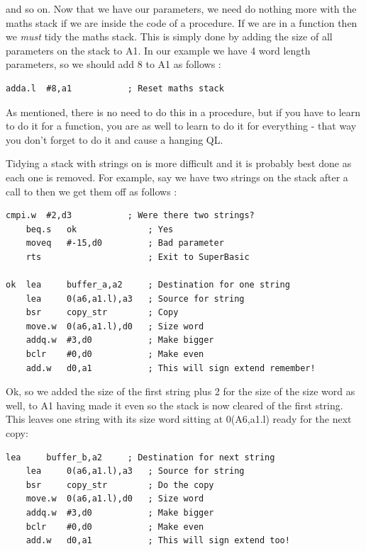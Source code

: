and so on. Now that we have our parameters, we need do nothing more
    with the maths stack if we are inside the code of a procedure. If we are
    in a function then we \emph{must} tidy the maths stack. This is simply done by
    adding the size of all parameters on the stack to A1. In our example we
    have 4 word length parameters, so we should add 8 to A1 as follows
   :

\begin{lstlisting}[firstnumber=1,]
        adda.l  #8,a1           ; Reset maths stack
\end{lstlisting}

As mentioned, there is no need to do this in a procedure, but if you
    have to learn to do it for a function, you are as well to learn to do it
    for everything -{} that way you don't forget to do it and cause a hanging
    QL.

Tidying a stack with strings on is more difficult and it is probably
    best done as each one is removed. For example, say we have two strings on
    the stack after a call to  then we get them off as follows
   :
\begin{lstlisting}[firstnumber=1,caption={Tidying a String from the Maths Stack - Part 1},label={lst:StringStackTidyPart1}]
    cmpi.w  #2,d3           ; Were there two strings?
    beq.s   ok              ; Yes
    moveq   #-15,d0         ; Bad parameter
    rts                     ; Exit to SuperBasic

ok  lea     buffer_a,a2     ; Destination for one string
    lea     0(a6,a1.l),a3   ; Source for string
    bsr     copy_str        ; Copy
    move.w  0(a6,a1.l),d0   ; Size word
    addq.w  #3,d0           ; Make bigger
    bclr    #0,d0           ; Make even
    add.w   d0,a1           ; This will sign extend remember!
\end{lstlisting}

Ok, so we added the size of the first string plus 2 for the size of
    the size word as well, to A1 having made it even so the stack is now
    cleared of the first string. This leaves one string with its size word
    sitting at 0(A6,a1.l) ready for the next copy:

\begin{lstlisting}[firstnumber=1,caption={Tidying a String from the Maths Stack - Part 2},label={lst:StringStackTidyParty2}]
    lea     buffer_b,a2     ; Destination for next string
    lea     0(a6,a1.l),a3   ; Source for string
    bsr     copy_str        ; Do the copy
    move.w  0(a6,a1.l),d0   ; Size word
    addq.w  #3,d0           ; Make bigger
    bclr    #0,d0           ; Make even
    add.w   d0,a1           ; This will sign extend too!
\end{lstlisting}

